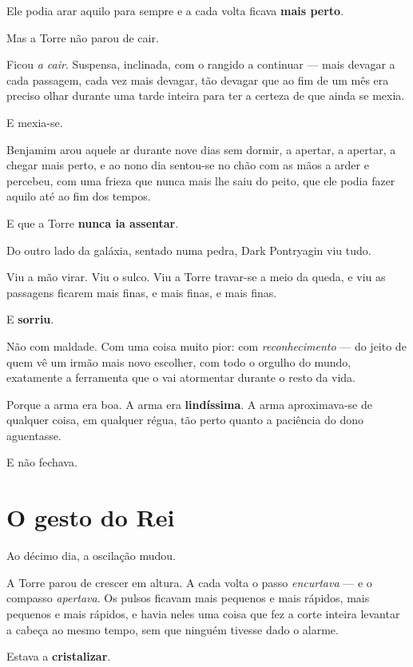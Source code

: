 \documentclass[livro.tex]{subfiles}
\begin{document}
Ele podia arar aquilo para sempre e a cada volta ficava \textbf{mais perto}.

\medskip

Mas a Torre não parou de cair.

Ficou \emph{a cair}. Suspensa, inclinada, com o rangido a continuar --- mais devagar a cada passagem, cada vez mais
devagar, tão devagar que ao fim de um mês era preciso olhar durante uma tarde inteira para ter a certeza de que
ainda se mexia.

E mexia-se.

Benjamim arou aquele ar durante nove dias sem dormir, a apertar, a apertar, a chegar mais perto, e ao nono dia
sentou-se no chão com as mãos a arder e percebeu, com uma frieza que nunca mais lhe saiu do peito, que ele podia
fazer aquilo até ao fim dos tempos.

E que a Torre \textbf{nunca ia assentar}.

\medskip

Do outro lado da galáxia, sentado numa pedra, Dark Pontryagin viu tudo.

Viu a mão virar. Viu o sulco. Viu a Torre travar-se a meio da queda, e viu as passagens ficarem mais finas, e mais
finas, e mais finas.

E \textbf{sorriu}.

Não com maldade. Com uma coisa muito pior: com \emph{reconhecimento} --- do jeito de quem vê um irmão mais novo
escolher, com todo o orgulho do mundo, exatamente a ferramenta que o vai atormentar durante o resto da vida.

Porque a arma era boa. A arma era \textbf{lindíssima}. A arma aproximava-se de qualquer coisa, em qualquer régua,
tão perto quanto a paciência do dono aguentasse.

E não fechava.

\section*{O gesto do Rei}

Ao décimo dia, a oscilação mudou.

A Torre parou de crescer em altura. A cada volta o passo \emph{encurtava} --- e o compasso \emph{apertava}. Os
pulsos ficavam mais pequenos e mais rápidos, mais pequenos e mais rápidos, e havia neles uma coisa que fez a corte
inteira levantar a cabeça ao mesmo tempo, sem que ninguém tivesse dado o alarme.

Estava a \textbf{cristalizar}.
\end{document}
